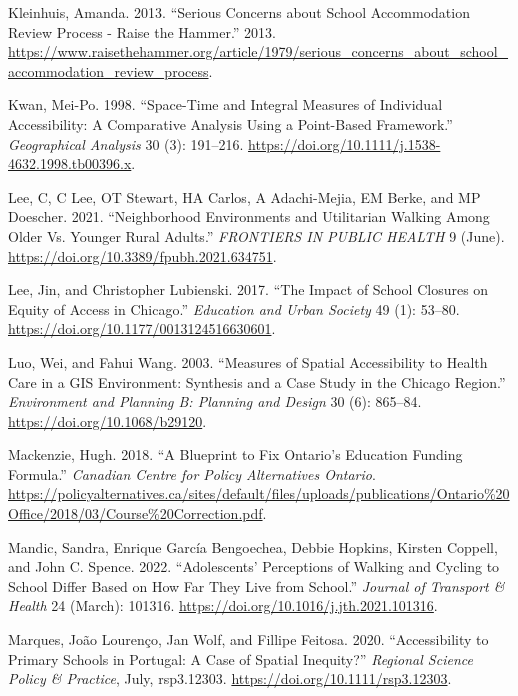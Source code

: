 \documentclass[
default
]{sn-jnl}
\newlength{\cslhangindent}
\newenvironment{CSLReferences}[2] %
 {\begin{list}{}{%
  \setlength{\itemindent}{0pt}
  \setlength{\leftmargin}{0pt}
  \setlength{\parsep}{0pt}
  \ifodd #1
   \setlength{\leftmargin}{\cslhangindent}
   \setlength{\itemindent}{-1\cslhangindent}
  \fi
  \setlength{\itemsep}{#2\baselineskip}}}
 {\end{list}}
\begin{document}
\begin{CSLReferences}{1}{0}
Kleinhuis, Amanda. 2013. {``Serious Concerns about School Accommodation
Review Process - Raise the Hammer.''} 2013.
\url{https://www.raisethehammer.org/article/1979/serious_concerns_about_school_accommodation_review_process}.

Kwan, Mei-Po. 1998. {``Space-Time and Integral Measures of Individual
Accessibility: A Comparative Analysis Using a Point-Based Framework.''}
\emph{Geographical Analysis} 30 (3): 191--216.
\url{https://doi.org/10.1111/j.1538-4632.1998.tb00396.x}.

Lee, C, C Lee, OT Stewart, HA Carlos, A Adachi-Mejia, EM Berke, and MP
Doescher. 2021. {``Neighborhood Environments and Utilitarian Walking
Among Older Vs. Younger Rural Adults.''} \emph{{FRONTIERS} {IN} {PUBLIC}
{HEALTH}} 9 (June). \url{https://doi.org/10.3389/fpubh.2021.634751}.

Lee, Jin, and Christopher Lubienski. 2017. {``The Impact of School
Closures on Equity of Access in Chicago.''} \emph{Education and Urban
Society} 49 (1): 53--80. \url{https://doi.org/10.1177/0013124516630601}.

Luo, Wei, and Fahui Wang. 2003. {``Measures of {Spatial Accessibility}
to {Health Care} in a {GIS Environment}: {Synthesis} and a {Case Study}
in the {Chicago Region}.''} \emph{Environment and Planning B: Planning
and Design} 30 (6): 865--84. \url{https://doi.org/10.1068/b29120}.

Mackenzie, Hugh. 2018. {``A Blueprint to Fix Ontario's Education Funding
Formula.''} \emph{Canadian Centre for Policy Alternatives {\textbar}
Ontario}.
\url{https://policyalternatives.ca/sites/default/files/uploads/publications/Ontario\%20Office/2018/03/Course\%20Correction.pdf}.

Mandic, Sandra, Enrique García Bengoechea, Debbie Hopkins, Kirsten
Coppell, and John C. Spence. 2022. {``Adolescents' Perceptions of
Walking and Cycling to School Differ Based on How Far They Live from
School.''} \emph{Journal of Transport \& Health} 24 (March): 101316.
\url{https://doi.org/10.1016/j.jth.2021.101316}.

Marques, João Lourenço, Jan Wolf, and Fillipe Feitosa. 2020.
{``Accessibility to Primary Schools in Portugal: A Case of Spatial
Inequity?''} \emph{Regional Science Policy \& Practice}, July,
rsp3.12303. \url{https://doi.org/10.1111/rsp3.12303}.


\end{CSLReferences}
\end{document}
